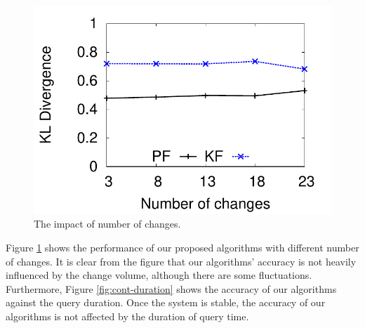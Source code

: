\documentclass[12pt]{report}
\begin{document}
\begin{figure}[htbp]
\centering
\includegraphics[width=.5\textwidth]{img/cont-kl-n.pdf}
\caption{\label{fig:cont-number-of-changes}
The impact of number of changes.}
\end{figure}

Figure \ref{fig:cont-number-of-changes} shows the performance of our
proposed algorithms with different number of changes.  It is clear
from the figure that our algorithms' accuracy is not heavily
influenced by the change volume, although there are some
fluctuations.  Furthermore, Figure \ref{fig:cont-duration} shows the
accuracy of our algorithms against the query duration.  Once the
system is stable, the accuracy of our algorithms is not affected
by the duration of query time.
\end{document}

